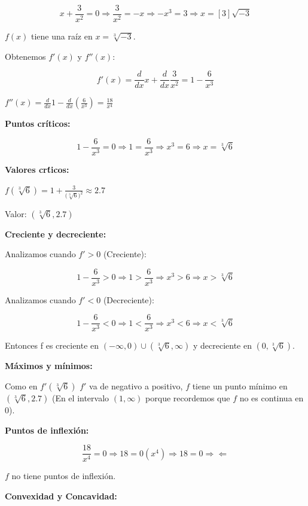 \documentclass[12pt]{article}
\begin{document}
\begin{enumerate}[\hspace{9px} a)]
        \[x+\displaystyle\frac{3}{x^2}=0 \Rightarrow \frac{3}{x^2}=-x \Rightarrow -x^3=3 \Rightarrow x=[3]\sqrt{-3}\]

        $f(x)$ tiene una ra\'iz en $x=\sqrt[3]{-3}$.

        Obtenemos $f'(x)$ y $f''(x)$:

        \[f'(x) = \displaystyle\frac{d}{dx}x+\frac{d}{dx}\frac{3}{x^2}=1-\frac{6}{x^3}\]

        \(f''(x) = \displaystyle\frac{d}{dx}1-\frac{d}{dx}\left(\frac{6}{x^3}\right) = \frac{18}{x^4}\)\medskip

        \textbf{Puntos cr\'iticos:}\medskip

        \[1-\displaystyle\frac{6}{x^3} = 0 \Rightarrow 1 = \frac{6}{x^3} \Rightarrow x^3=6 \Rightarrow x=\sqrt[3]{6}\]

        \textbf{Valores cr\'ticos:}

        \(f(\sqrt[3]{6}) = 1 + \displaystyle\frac{3}{\big(\sqrt[3]{6}\big)^2}\approx 2.7\)\medskip
        
        Valor: $(\sqrt[3]{6},2.7)$\medskip

        \textbf{Creciente y decreciente:}\medskip

        Analizamos cuando $f'>0$ (Creciente):

        \[1-\displaystyle\frac{6}{x^3}>0 \Rightarrow 1>\frac{6}{x^3} \Rightarrow x^3>6 \Rightarrow x>\sqrt[3]{6}\]

        Analizamos cuando $f'<0$ (Decreciente):

        \[1-\displaystyle\frac{6}{x^3}<0 \Rightarrow 1<\frac{6}{x^3} \Rightarrow x^3<6 \Rightarrow x<\sqrt[3]{6}\]

        Entonces f es creciente en $(-\infty,0)\cup(\sqrt[3]{6},\infty)$ y decreciente en $(0,\sqrt[3]{6})$.\medskip

        \textbf{M\'aximos y m\'inimos:}\medskip

        Como en $f'(\sqrt[3]{6})$ $f'$ va de negativo a positivo, $f$ tiene un punto m\'inimo en $(\sqrt[3]{6},2.7)$ (En el intervalo $(1,\infty)$ porque recordemos que $f$ no es continua en 0).\medskip

        \textbf{Puntos de inflexi\'on:}

        \[\displaystyle\frac{18}{x^4} = 0 \Rightarrow 18=0(x^4) \Rightarrow 18=0 \Rightarrow\!\Leftarrow\]

        $f$ no tiene puntos de inflexi\'on.\medskip

        \textbf{Convexidad y Concavidad:}\medskip


\end{enumerate}
\end{document}
